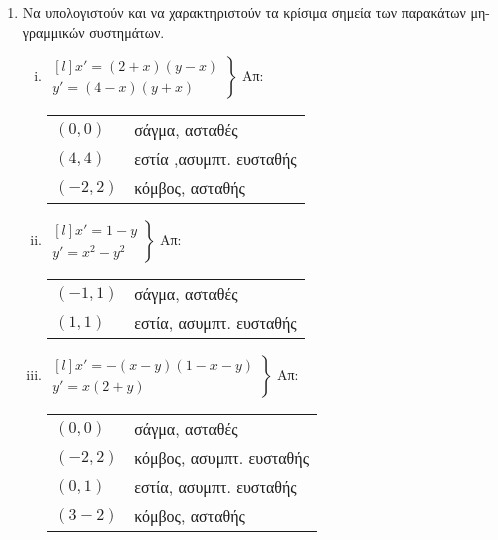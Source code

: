 



\thispagestyle{askhseis}




\begin{center}
  \minibox{\bfseries \large \textcolor{Col1}{Μη Γραμμικά Συστήματα}}
\end{center}

\vspace{\baselineskip}

\begin{enumerate}
    \item Να υπολογιστούν και να χαρακτηριστούν τα κρίσιμα σημεία των παρακάτων 
        μη-γραμμικών συστημάτων.

        \begin{enumerate}[i)]
            \setlength\itemsep{2\baselineskip}
        \item $ 
            \left.
                \begin{matrix*}[l]
                    x' = (2+x)(y-x) \\
                    y' = (4-x)(y+x) 
                \end{matrix*}
            \right\}$ \hfill Απ:  
            \begin{tabular}{ll}
                $ (0,0) $ & σάγμα, ασταθές \\
                $ (4,4) $ & εστία ,ασυμπτ. ευσταθής \\
                $ (-2,2) $ & κόμβος, ασταθής
            \end{tabular} 

        \item $ 
            \left.
                \begin{matrix*}[l]
                    x' = 1-y \\
                    y' = x^{2} - y^{2}
                \end{matrix*}
            \right\}$ \hfill Απ:  
            \begin{tabular}{ll}
                $ (-1,1) $ & σάγμα, ασταθές  \\
                $ (1,1) $ & εστία, ασυμπτ. ευσταθής
            \end{tabular}  

        \item $ 
            \left.
                \begin{matrix*}[l]
                    x' = - (x-y)(1-x-y) \\
                    y' = x(2+y)
                \end{matrix*}
            \right\} $ \hfill Απ: \begin{tabular}{ll}
                $ (0,0) $ & σάγμα, ασταθές \\
                $ (-2,2) $ & κόμβος, ασυμπτ. ευσταθής \\
                $ (0,1) $ & εστία, ασυμπτ. ευσταθής \\
                $ (3 -2) $ & κόμβος, ασταθής
            \end{tabular} 


\end{enumerate}
\end{enumerate}
